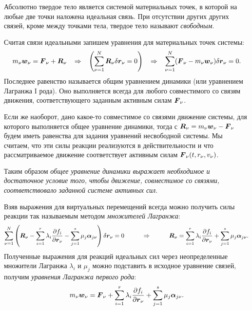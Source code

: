 Абсолютно твердое тело является системой материальных точек, в которой на любые две точки наложена идеальная связь. При отсутствии других других связей, кроме между точками тела, твердое тело называют \textit{свободным}.

Считая связи идеальными запишем уравнения для материальных точек системы:
\begin{equation*}
	m_{\nu} \mbox{\boldmath $w$}_\nu = \mbox{\boldmath $F$}_\nu + \mbox{\boldmath $R$}_\nu
	\hspace*{0.3 cm}
	\Rightarrow
	\hspace*{0.3 cm}
	\left(
	\sum_{\nu=1}^N \mbox{\boldmath $R$}_\nu \delta \mbox{\boldmath $r$}_\nu = 0\right)
	\hspace*{0.3 cm}
	\Rightarrow
	\hspace*{0.3 cm}
	\sum_{\nu = 1}^{N}(\mbox{\boldmath $F$}_\nu - m_\nu \mbox{\boldmath $w$}_\nu) \delta \mbox{\boldmath $r$}_{\nu} = 0.
\end{equation*}
Последнее равенство называется общим уравнением динамики (или уравнением Лагранжа I рода). Оно выполняется всегда для любого совместимого со связям движения, соответствующего заданным активным силам $\mbox{\boldmath $F$}_{\nu}$.

Если же наоборот, дано какое-то совместимое со связями движение системы, для которого выполняется общее уравнение динамики, тогда с $\mbox{\boldmath $R$}_\nu = m_\nu \mbox{\boldmath $w$}_\nu - \mbox{\boldmath $F$}_\nu$ будем иметь равенства для задания уравнений несвободной системы. Мы считаем, что эти силы реакции реализуются в действительности и что рассматриваемое движение соответствует активным силам $\mbox{\boldmath $F$}_\nu (t,r_\nu, v_\nu)$.

Таким образом  \textit{общее уравнение динамики выражает необходимое и достаточное условие того, чтобы движение, совместимое со связями, соответствовало заданной системе активных сил}.

Взяв выражения для виртуальных перемещений всегда можно получить силы реакции так называемым методом \textit{множителей Лагранжа}:
\begin{equation*}
	\sum_{\nu=1}^N \left(\mbox{\boldmath $R$}_\nu - \sum_{i = 1}^r \lambda_i \frac{\partial f_i}{\partial \mbox{\boldmath $r$}_\nu} - \sum_{j = 1}^s \mu_j \mbox{\boldmath $\alpha$}_{j \nu}\right) \delta \mbox{\boldmath $r$}_\nu = 0
	\hspace*{1 cm}
	\Rightarrow
	\hspace*{1 cm}
	\mbox{\boldmath $R$}_\nu = \sum_{i = 1}^r \lambda_i \frac{\partial f_i}{\partial \mbox{\boldmath $r$}_\nu} + \sum_{j = 1}^s \mu_j \mbox{\boldmath $\alpha$}_{j \nu}.
\end{equation*}
Полученные выражения для реакций идеальных сил через неопределенные множители Лагранжа $\lambda_i $ и $\mu_j $ можно подставить в исходное уравнение связей, получим \textit{уравнения Лагранжа первого рода}:
\begin{equation*}
	m_\nu \mbox{\boldmath $w$}_\nu = \mbox{\boldmath $F$}_\nu + \sum_{i = 1}^r \lambda_i \frac{\partial f_i}{\partial \mbox{\boldmath $r$}_\nu} + \sum_{j = 1}^s \mu_j \mbox{\boldmath $\alpha$}_{j \nu}.
\end{equation*}